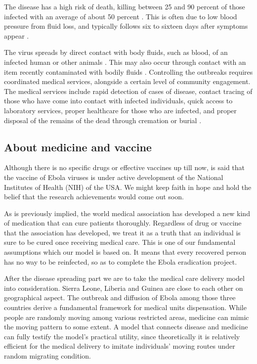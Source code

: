 \documentclass[12pt]{article}
\begin{document}
The disease has a high risk of death, killing between 25 and 90 percent of those infected with an average of about 50 percent \cite{Ebolavirusdisease}. This is often due to low blood pressure from fluid loss, and typically follows six to sixteen days after symptoms appear \cite{singh2014viral}.

The virus spreads by direct contact with body fluids, such as blood, of an infected human or other animals \cite{Ebolavirusdisease}. This may also occur through contact with an item recently contaminated with bodily fluids \cite{Ebolavirusdisease}. Controlling the outbreaks requires coordinated medical services, alongside a certain level of community engagement. The medical services include rapid detection of cases of disease, contact tracing of those who have come into contact with infected individuals, quick access to laboratory services, proper healthcare for those who are infected, and proper disposal of the remains of the dead through cremation or burial \cite{Ebolavirusdisease, GuidanceforSafeHandling}.

\subsection{About medicine and vaccine}

Although there is no specific drugs or effective vaccines up till now, is said that the vaccine of Ebola viruses is under active development of the National Institutes of Health (NIH) of the USA. We might keep faith in hope and hold the belief that the research achievements would come out soon.

As is previously implied, the world medical association has developed a new kind of medication that can cure patients thoroughly. Regardless of drug or vaccine that the association has developed, we treat it as a truth that an individual is sure to be cured once receiving medical care. This is one of our fundamental assumptions which our model is based on. It means that every recovered person has no way to be reinfected, so as to complete the Ebola eradication project. 

After the disease spreading part we are to take the medical care delivery model into consideration. Sierra Leone, Liberia and Guinea are close to each other on geographical aspect. The outbreak and diffusion of Ebola among those three countries derive a fundamental framework for medical units dispensation. While people are randomly moving among various restricted areas, medicine can mimic the moving pattern to some extent. A model that connects disease and medicine can fully testify the model's practical utility, since theoretically it is relatively efficient for the medical delivery to imitate individuals' moving routes under random migrating condition. 
\end{document}
